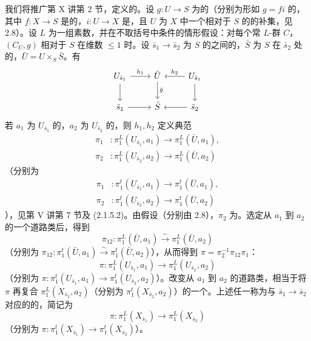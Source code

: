 我们将推广第 X 讲第 2 节，定义的。设 $g:U\to S$ 为的（分别为形如 $g=fi$ 的，其中 $f:X\to S$ 是的，$i:U\to X$ 是，且 $U$ 为 $X$ 中一个相对于 $S$ 的的补集，见 2.8）。设 $L$ 为一组素数，并在不取括号中条件的情形假设：对每个常 $L$-群 $C$，$(C_U,g)$ 相对于 $S$ 在维数 $\leqslant1$ 时。设 $\bar s_1\to\bar s_2$ 为 $S$ 的之间的，$\bar S$ 为 $S$ 在 $\bar s_2$ 处的，$\bar U=U\times_S\bar S$。有
\[
\begin{tikzcd}
U_{\bar s_1}\arrow[r,"h_1"]\arrow[d]&\bar U\arrow[d,"\bar g"]&U_{\bar s_1}\arrow[l,"h_2"']\arrow[d]\\
\bar s_1\arrow[r]&\bar S&\bar s_2\arrow[l]
\end{tikzcd}
\]
若 $a_1$ 为 $U_{\bar s_1}$ 的，$a_2$ 为 $U_{\bar s_2}$ 的，则 $h_1,h_2$ 定义典范
\[
\begin{aligned}
\pi_1&:\pi_1^L(U_{\bar s_1},a_1)\longrightarrow\pi_1^L(\bar U,a_1),\\
\pi_2&:\pi_1^L(U_{\bar s_2},a_2)\longrightarrow\pi_1^L(\bar U,a_2)
\end{aligned}
\]
（分别为
\[
\begin{aligned}
\pi_1&:\pi_1^t(U_{\bar s_1},a_1)\longrightarrow\pi_1^t(\bar U,a_1),\\
\pi_2&:\pi_1^t(U_{\bar s_2},a_2)\longrightarrow\pi_1^t(\bar U,a_2)
\end{aligned}
\]
），见第 V 讲第 7 节及 (2.1.5.2)。由假设（分别由 2.8），$\pi_2$ 为。选定从 $a_1$ 到 $a_2$ 的一个道路类后，得到
\[\pi_{12}:\pi_1^L(\bar U,a_1)\xrightarrow{\sim}\pi_1^L(\bar U,a_2)\]
（分别为 $\pi_{12}:\pi_1^t(\bar U,a_1)\xrightarrow{\sim}\pi_1^t(\bar U,a_2)$），从而得到 $\pi=\pi_2^{-1}\pi_{12}\pi_1$：
\[\pi:\pi_1^L(U_{\bar s_1},a_1)\longrightarrow\pi_1^L(U_{\bar s_2},a_2)\]
（分别为 $\pi:\pi_1^t(U_{\bar s_1},a_1)\to\pi_1^t(U_{\bar s_2},a_2)$）。改变从 $a_1$ 到 $a_2$ 的道路类，相当于将 $\pi$ 再复合 $\pi_1^L(X_{\bar s_2},a_2)$（分别为 $\pi_1^t(X_{\bar s_2},a_2)$）的一个。上述任一称为与 $\bar s_1\to\bar s_2$ 对应的的，简记为
\[\pi:\pi_1^L(X_{\bar s_1})\longrightarrow\pi_1^L(X_{\bar s_2})\]
（分别为 $\pi:\pi_1^t(X_{\bar s_1})\to\pi_1^t(X_{\bar s_2})$）。

